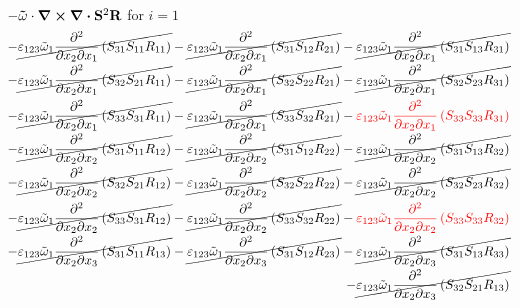 $-\mathbf{\tilde{\omega}}\cdot\curl \div \mathbf{S}^2 \mathbf{R}$ for $i=1$
\begin{equation}
	\begin{split}
		-\cancel{\varepsilon_{123}\tilde{\omega}_{1}\pdv{}{x_{2}}{x_{1}}\left(S_{31}S_{11}R_{11}\right)}
		-\cancel{\varepsilon_{123}\tilde{\omega}_{1}\pdv{}{x_{2}}{x_{1}}\left(S_{31}S_{12}R_{21}\right)}
		-\cancel{\varepsilon_{123}\tilde{\omega}_{1}\pdv{}{x_{2}}{x_{1}}\left(S_{31}S_{13}R_{31}\right)}\\
		-\cancel{\varepsilon_{123}\tilde{\omega}_{1}\pdv{}{x_{2}}{x_{1}}\left(S_{32}S_{21}R_{11}\right)}
		-\cancel{\varepsilon_{123}\tilde{\omega}_{1}\pdv{}{x_{2}}{x_{1}}\left(S_{32}S_{22}R_{21}\right)}
		-\cancel{\varepsilon_{123}\tilde{\omega}_{1}\pdv{}{x_{2}}{x_{1}}\left(S_{32}S_{23}R_{31}\right)}\\
		-\cancel{\varepsilon_{123}\tilde{\omega}_{1}\pdv{}{x_{2}}{x_{1}}\left(S_{33}S_{31}R_{11}\right)}
		-\cancel{\varepsilon_{123}\tilde{\omega}_{1}\pdv{}{x_{2}}{x_{1}}\left(S_{33}S_{32}R_{21}\right)}
		-{\color{red}\varepsilon_{123}\tilde{\omega}_{1}\pdv{}{x_{2}}{x_{1}}\left(S_{33}S_{33}R_{31}\right)}\\
		-\cancel{\varepsilon_{123}\tilde{\omega}_{1}\pdv{}{x_{2}}{x_{2}}\left(S_{31}S_{11}R_{12}\right)}
		-\cancel{\varepsilon_{123}\tilde{\omega}_{1}\pdv{}{x_{2}}{x_{2}}\left(S_{31}S_{12}R_{22}\right)}
		-\cancel{\varepsilon_{123}\tilde{\omega}_{1}\pdv{}{x_{2}}{x_{2}}\left(S_{31}S_{13}R_{32}\right)}\\
		-\cancel{\varepsilon_{123}\tilde{\omega}_{1}\pdv{}{x_{2}}{x_{2}}\left(S_{32}S_{21}R_{12}\right)}
		-\cancel{\varepsilon_{123}\tilde{\omega}_{1}\pdv{}{x_{2}}{x_{2}}\left(S_{32}S_{22}R_{22}\right)}
		-\cancel{\varepsilon_{123}\tilde{\omega}_{1}\pdv{}{x_{2}}{x_{2}}\left(S_{32}S_{23}R_{32}\right)}\\
		-\cancel{\varepsilon_{123}\tilde{\omega}_{1}\pdv{}{x_{2}}{x_{2}}\left(S_{33}S_{31}R_{12}\right)}
		-\cancel{\varepsilon_{123}\tilde{\omega}_{1}\pdv{}{x_{2}}{x_{2}}\left(S_{33}S_{32}R_{22}\right)}
		-{\color{red}\varepsilon_{123}\tilde{\omega}_{1}\pdv{}{x_{2}}{x_{2}}\left(S_{33}S_{33}R_{32}\right)}\\
		-\cancel{\varepsilon_{123}\tilde{\omega}_{1}\pdv{}{x_{2}}{x_{3}}\left(S_{31}S_{11}R_{13}\right)}
		-\cancel{\varepsilon_{123}\tilde{\omega}_{1}\pdv{}{x_{2}}{x_{3}}\left(S_{31}S_{12}R_{23}\right)}
		-\cancel{\varepsilon_{123}\tilde{\omega}_{1}\pdv{}{x_{2}}{x_{3}}\left(S_{31}S_{13}R_{33}\right)}\\
		-\cancel{\varepsilon_{123}\tilde{\omega}_{1}\pdv{}{x_{2}}{x_{3}}\left(S_{32}S_{21}R_{13}\right)}

\end{split}
\end{equation}
